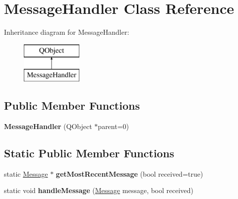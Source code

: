 \hypertarget{class_message_handler}{}\section{Message\+Handler Class Reference}
\label{class_message_handler}
Inheritance diagram for Message\+Handler\+:\begin{figure}[H]
\begin{center}
\leavevmode
\includegraphics[height=2.000000cm]{class_message_handler}
\end{center}
\end{figure}
\subsection*{Public Member Functions}
\begin{DoxyCompactItemize}
\item 
\hypertarget{class_message_handler_a9dfaad39ced765947bf2dd27188de452}{}{\bfseries Message\+Handler} (Q\+Object $\ast$parent=0)\label{class_message_handler_a9dfaad39ced765947bf2dd27188de452}

\end{DoxyCompactItemize}
\subsection*{Static Public Member Functions}
\begin{DoxyCompactItemize}
\item 
\hypertarget{class_message_handler_a42b14784fcc1502b639c656f9e2b2622}{}static \hyperlink{struct_message}{Message} $\ast$ {\bfseries get\+Most\+Recent\+Message} (bool received=true)\label{class_message_handler_a42b14784fcc1502b639c656f9e2b2622}

\item 
\hypertarget{class_message_handler_aa9e5166886e7e73e51f99ddf585249b1}{}static void {\bfseries handle\+Message} (\hyperlink{struct_message}{Message} message, bool received)\label{class_message_handler_aa9e5166886e7e73e51f99ddf585249b1}

\end{DoxyCompactItemize}
